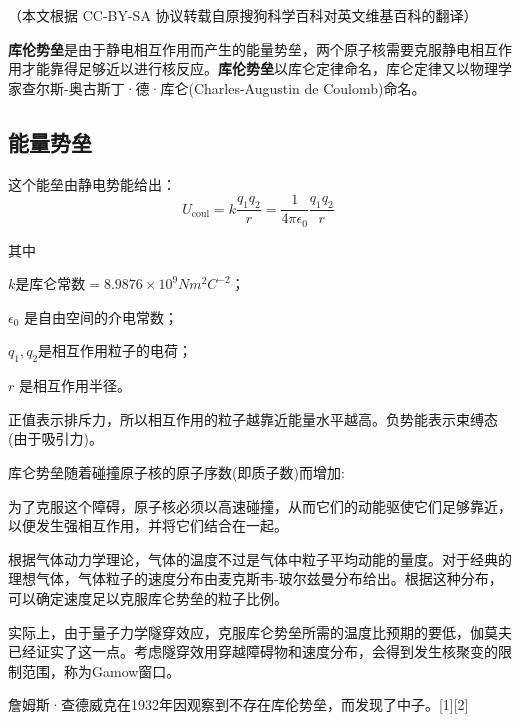 
（本文根据 CC-BY-SA 协议转载自原搜狗科学百科对英文维基百科的翻译）

\textbf{库伦势垒}是由于静电相互作用而产生的能量势垒，两个原子核需要克服静电相互作用才能靠得足够近以进行核反应。\textbf{库伦势垒}以库仑定律命名，库仑定律又以物理学家查尔斯-奥古斯丁·德·库仑(Charles-Augustin de Coulomb)命名。

\subsection{能量势垒}
这个能垒由静电势能给出：
$$U_{\text{coul}} = k \frac{q_1 q_2}{r} = \frac{1}{4\pi\epsilon_0} \frac{q_1 q_2}{r}~$$

其中

$k\text{是库仑常数}= 8.9876\times10^9 N m^2 C^{-2}$；

$\epsilon_0$ 是自由空间的介电常数；

$q_1, q_2$是相互作用粒子的电荷；

$r$ 是相互作用半径。

正值表示排斥力，所以相互作用的粒子越靠近能量水平越高。负势能表示束缚态(由于吸引力)。

库仑势垒随着碰撞原子核的原子序数(即质子数)而增加:

为了克服这个障碍，原子核必须以高速碰撞，从而它们的动能驱使它们足够靠近，以便发生强相互作用，并将它们结合在一起。

根据气体动力学理论，气体的温度不过是气体中粒子平均动能的量度。对于经典的理想气体，气体粒子的速度分布由麦克斯韦-玻尔兹曼分布给出。根据这种分布，可以确定速度足以克服库仑势垒的粒子比例。

实际上，由于量子力学隧穿效应，克服库仑势垒所需的温度比预期的要低，伽莫夫已经证实了这一点。考虑隧穿效用穿越障碍物和速度分布，会得到发生核聚变的限制范围，称为Gamow窗口。

詹姆斯·查德威克在1932年因观察到不存在库伦势垒，而发现了中子。[1][2]